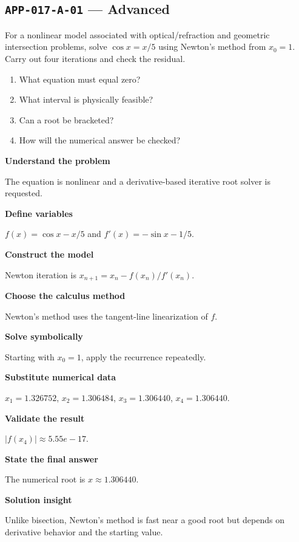 \documentclass[11pt]{book}
\newcommand{\pid}[1]{\texttt{#1}}
\begin{document}
\subsection*{\pid{APP-017-A-01} — Advanced}
\begin{problembox}
For a nonlinear model associated with optical/refraction and geometric intersection problems, solve $\cos x=x/5$ using Newton's method from $x_0=1$. Carry out four iterations and check the residual.
\end{problembox}
\begin{promptbox}\begin{enumerate}
\item What equation must equal zero?
\item What interval is physically feasible?
\item Can a root be bracketed?
\item How will the numerical answer be checked?
\end{enumerate}\end{promptbox}
\begin{solutionbox}
\textbf{Understand the problem}\par The equation is nonlinear and a derivative-based iterative root solver is requested.\par\medskip
\textbf{Define variables}\par $f(x)=\cos x-x/5$ and $f'(x)=-\sin x-1/5$.\par\medskip
\textbf{Construct the model}\par Newton iteration is $x_{n+1}=x_n-f(x_n)/f'(x_n)$.\par\medskip
\textbf{Choose the calculus method}\par Newton’s method uses the tangent-line linearization of $f$.\par\medskip
\textbf{Solve symbolically}\par Starting with $x_0=1$, apply the recurrence repeatedly.\par\medskip
\textbf{Substitute numerical data}\par $x_1=1.326752$, $x_2=1.306484$, $x_3=1.306440$, $x_4=1.306440$.\par\medskip
\textbf{Validate the result}\par $|f(x_4)|\approx 5.55e-17$.\par\medskip
\textbf{State the final answer}\par The numerical root is $x\approx 1.306440$.\par\medskip
\textbf{Solution insight}\par Unlike bisection, Newton’s method is fast near a good root but depends on derivative behavior and the starting value.\par\medskip
\end{solutionbox}
\end{document}
